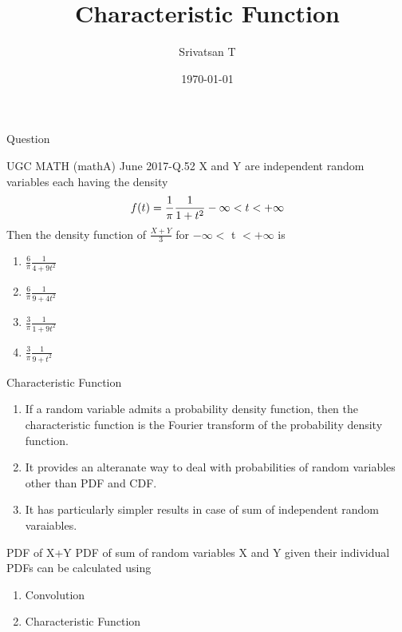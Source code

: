 \documentclass{beamer}
\title{Characteristic Function}
\author{Srivatsan T}
\institute{IITH}
\date{\today}
\begin{document}
\begin{frame}
  \titlepage
\end{frame}
\begin{frame}{Question}
  \begin{block}{UGC MATH (mathA) June 2017-Q.52}
    X and Y are independent random variables each having the density
    \begin{align}
      f(t) = \displaystyle\frac{1}{\pi} \frac{1}{1+{t}^2} -\infty < t < +\infty\notag
    \end{align}
    Then the density function of $\displaystyle\frac{X+Y}{3}$ for $-\infty <$ t $< +\infty$ is\bigskip
    \begin{multicols}{2}
      \begin{enumerate}\itemsep0.5cm
        \item $\displaystyle\frac{6}{\pi} \frac{1}{4+9{t}^2}$
        \item $\displaystyle\frac{6}{\pi} \frac{1}{9+4{t}^2}$
        \item $\displaystyle\frac{3}{\pi} \frac{1}{1+9{t}^2}$
        \item $\displaystyle\frac{3}{\pi} \frac{1}{9+{t}^2}$\\
      \end{enumerate}
    \end{multicols}
  \end{block}
\end{frame}
\begin{frame}{Characteristic Function}
  \begin{enumerate}
    \item If a random variable admits a probability density function, then the characteristic function
          is the Fourier transform of the probability density function.
    \item    It provides an alteranate way to deal with probabilities of random variables
          other than PDF and CDF.
    \item It has particularly simpler results in case of sum of independent random varaiables.
  \end{enumerate}
\end{frame}
\begin{frame}{PDF of X+Y}
  PDF of sum of random variables X and Y given their individual PDFs can be calculated using
  \begin{enumerate}
    \item Convolution
    \item Characteristic Function
  \end{enumerate}
\end{frame}
\end{document}
